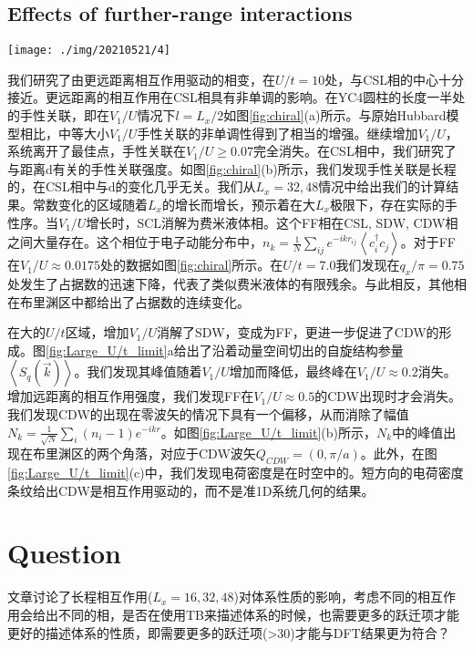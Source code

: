 \documentclass[reprint, aps, prb, showkeys]{revtex4-2}
\begin{document}
\subsection{Effects of further-range interactions}
\begin{figure*}[hb]
    \texttt{[image: ./img/20210521/4]}
    \caption{\label{fig:Large_U/t_limit} 
    Large U/t limit.
    }
\end{figure*}
我们研究了由更远距离相互作用驱动的相变，在$U/t = 10$处，与CSL相的中心十分接近。更远距离的相互作用在CSL相具有非单调的影响。在YC4圆柱的长度一半处的手性关联，即在$V_1/U$情况下$l = L_x/2$如图\ref{fig:chiral}(a)所示。与原始Hubbard模型相比，中等大小$V_1/U$手性关联的非单调性得到了相当的增强。继续增加$V_1/U$，系统离开了最佳点，手性关联在$V_1/U \ge 0.07$完全消失。在CSL相中，我们研究了与距离d有关的手性关联强度。如图\ref{fig:chiral}(b)所示，我们发现手性关联是长程的，在CSL相中与d的变化几乎无关。我们从$L_x = 32, 48$情况中给出我们的计算结果。常数变化的区域随着$L_x$的增长而增长，预示着在大$L_x$极限下，存在实际的手性序。当$V_1/U$增长时，SCL消解为费米液体相。这个FF相在CSL, SDW, CDW相之间大量存在。这个相位于电子动能分布中，$n_k = \frac{1}{N} \sum_{ij} e^{-ikr_{ij}} \left\langle c_i^{\dagger} c_j \right\rangle$。对于FF在$V_1/U \approx 0.0175$处的数据如图\ref{fig:chiral}所示。在$U/t = 7.0$我们发现在$q_x/\pi = 0.75$处发生了占据数的迅速下降，代表了类似费米液体的有限残余。与此相反，其他相在布里渊区中都给出了占据数的连续变化。

在大的$U/t$区域，增加$V_1/U$消解了SDW，变成为FF，更进一步促进了CDW的形成。图\ref{fig:Large_U/t_limit}a给出了沿着动量空间切出的自旋结构参量$\left\langle S_q(\vec{k}) \right\rangle$。我们发现其峰值随着$V_1/U$增加而降低，最终峰在$V_1/U \approx 0.2$消失。增加远距离的相互作用强度，我们发现FF在$V_1/U \approx 0.5$的CDW出现时才会消失。我们发现CDW的出现在零波矢的情况下具有一个偏移，从而消除了幅值$N_k = \frac{1}{\sqrt{N}} \sum_i \left( n_i - 1 \right) e^{-ikr}$。如图\ref{fig:Large_U/t_limit}(b)所示，$N_k$中的峰值出现在布里渊区的两个角落，对应于CDW波矢$Q_{CDW} = (0, \pi/a)$。此外，在图\ref{fig:Large_U/t_limit}(c)中，我们发现电荷密度是在时空中的。短方向的电荷密度条纹给出CDW是相互作用驱动的，而不是准1D系统几何的结果。
\section{Question}
文章讨论了长程相互作用($L_x = 16, 32, 48$)对体系性质的影响，考虑不同的相互作用会给出不同的相，是否在使用TB来描述体系的时候，也需要更多的跃迁项才能更好的描述体系的性质，即需要更多的跃迁项(>30)才能与DFT结果更为符合？
\end{document}
